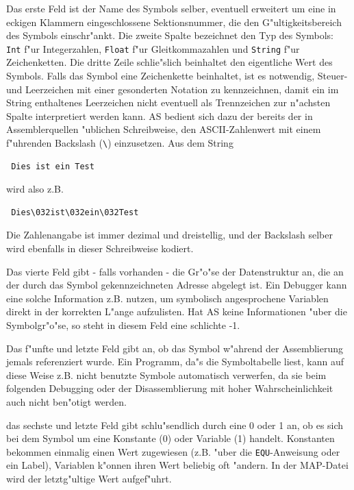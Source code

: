 \documentclass[12pt,a4paper,twoside]{report}
\newcommand{\tty}[1]{{\tt #1}}
\newcommand{\asname}{AS}
\begin{document}
Das erste Feld ist der Name des Symbols selber, eventuell erweitert
um eine in eckigen Klammern eingeschlossene Sektionsnummer, die den
G"ultigkeitsbereich des Symbols einschr"ankt.  Die zweite Spalte
bezeichnet den Typ des Symbols: \tty{Int} f"ur Integerzahlen, \tty{Float} f"ur
Gleitkommazahlen und \tty{String} f"ur Zeichenketten.  Die dritte Zeile
schlie"slich beinhaltet den eigentliche Wert des Symbols.  Falls das
Symbol eine Zeichenkette beinhaltet, ist es notwendig, Steuer- und
Leerzeichen mit einer gesonderten Notation zu kennzeichnen, damit ein
im String enthaltenes Leerzeichen nicht eventuell als Trennzeichen
zur n"achsten Spalte interpretiert werden kann.  \asname{} bedient sich dazu
der bereits der in Assemblerquellen "ublichen Schreibweise, den
ASCII-Zahlenwert mit einem f"uhrenden Backslash (\verb!\!) einzusetzen.  Aus
dem String
\begin{verbatim}
 Dies ist ein Test
\end{verbatim}
wird also z.B.
\begin{verbatim}
 Dies\032ist\032ein\032Test
\end{verbatim}
Die Zahlenangabe ist immer dezimal und dreistellig, und der Backslash
selber wird ebenfalls in dieser Schreibweise kodiert.

Das vierte Feld gibt - falls vorhanden - die Gr"o"se der Datenstruktur
an, die an der durch das Symbol gekennzeichneten Adresse abgelegt
ist.  Ein Debugger kann eine solche Information z.B. nutzen, um
symbolisch angesprochene Variablen direkt in der korrekten L"ange
aufzulisten.  Hat \asname{} keine Informationen "uber die Symbolgr"o"se, so
steht in diesem Feld eine schlichte -1.

Das f"unfte und letzte Feld gibt an, ob das Symbol w"ahrend der
Assemblierung jemals referenziert wurde. Ein Programm, da"s die
Symboltabelle liest, kann auf diese Weise z.B. nicht benutzte Symbole
automatisch verwerfen, da sie beim folgenden Debugging oder der
Disassemblierung mit hoher Wahrscheinlichkeit auch nicht ben"otigt werden.

das sechste und letzte Feld gibt schlu"sendlich durch eine 0 oder 1 an,
ob es sich bei dem Symbol um eine Konstante (0) oder Variable (1) handelt.
Konstanten bekommen einmalig einen Wert zugewiesen (z.B. "uber die
\tty{EQU}-Anweisung oder ein Label), Variablen k"onnen ihren Wert beliebig
oft "andern.  In der MAP-Datei wird der letztg"ultige Wert aufgef"uhrt.
\end{document}
